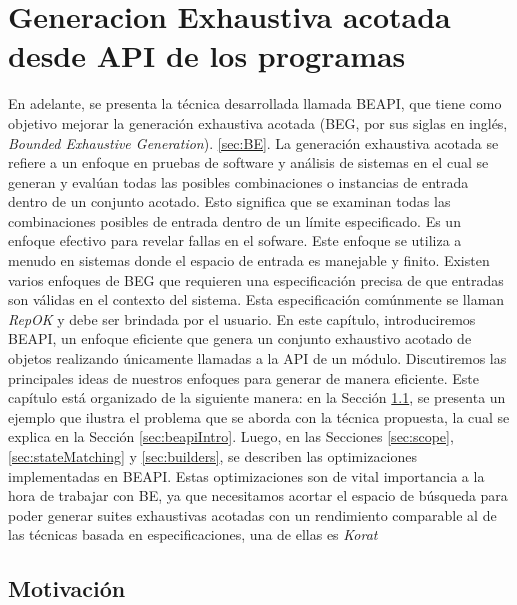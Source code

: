 \chapter{Generacion Exhaustiva acotada desde API de los programas}


\label{cap:beapi}

En adelante, se presenta la técnica desarrollada llamada BEAPI, que tiene como objetivo mejorar la generación exhaustiva acotada (BEG, por sus siglas en inglés, \emph{Bounded Exhaustive Generation}). \ref{sec:BE}. 
La generación exhaustiva acotada se refiere a un enfoque en pruebas de software y análisis de sistemas en el cual se generan y evalúan todas las posibles combinaciones o instancias de entrada dentro de un conjunto acotado. Esto significa que se examinan todas las combinaciones posibles de entrada dentro de un límite especificado. Es un enfoque efectivo para revelar fallas en el sofware. Este enfoque se utiliza a menudo en sistemas donde el espacio de entrada es manejable y finito. 
Existen varios enfoques de BEG que requieren una especificación precisa de que entradas son válidas en el contexto del sistema. Esta especificación comúnmente se llaman \emph{RepOK} y debe ser brindada por el usuario.
En este capítulo, introduciremos BEAPI, un enfoque eficiente que genera un conjunto exhaustivo acotado de objetos realizando únicamente llamadas a la API de un módulo. Discutiremos las principales ideas de nuestros enfoques para generar de manera eficiente. Este capítulo está organizado de la siguiente manera: en la Sección \ref{sec:motivating-example}, se presenta un ejemplo que ilustra el problema que se aborda con la técnica propuesta, la cual se explica en la Sección \ref{sec:beapiIntro}. Luego, en las Secciones \ref{sec:scope}, \ref{sec:stateMatching} y \ref{sec:builders}, se describen las optimizaciones implementadas en BEAPI. Estas optimizaciones son de vital importancia a la hora de trabajar con BE, ya que necesitamos acortar el espacio de búsqueda para poder generar suites exhaustivas acotadas con un rendimiento comparable al de las técnicas basada en especificaciones, una de ellas es \emph{Korat}\cite{Boyapati02} 


\section[Motivación]{Motivación}
\label{sec:motivating-example}


